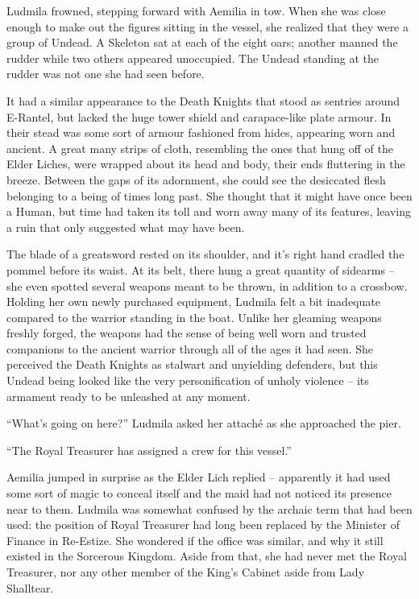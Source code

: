  

Ludmila frowned, stepping forward with Aemilia in tow. When she was close enough to make out the figures sitting in the vessel, she realized that they were a group of Undead. A Skeleton sat at each of the eight oars; another manned the rudder while two others appeared unoccupied. The Undead standing at the rudder was not one she had seen before.

 

It had a similar appearance to the Death Knights that stood as sentries around E-Rantel, but lacked the huge tower shield and carapace-like plate armour. In their stead was some sort of armour fashioned from hides, appearing worn and ancient. A great many strips of cloth, resembling the ones that hung off of the Elder Liches, were wrapped about its head and body, their ends fluttering in the breeze. Between the gaps of its adornment, she could see the desiccated flesh belonging to a being of times long past. She thought that it might have once been a Human, but time had taken its toll and worn away many of its features, leaving a ruin that only suggested what may have been.

 

The blade of a greatsword rested on its shoulder, and it’s right hand cradled the pommel before its waist. At its belt, there hung a great quantity of sidearms – she even spotted several weapons meant to be thrown, in addition to a crossbow. Holding her own newly purchased equipment, Ludmila felt a bit inadequate compared to the warrior standing in the boat. Unlike her gleaming weapons freshly forged, the weapons had the sense of being well worn and trusted companions to the ancient warrior through all of the ages it had seen. She perceived the Death Knights as stalwart and unyielding defenders, but this Undead being looked like the very personification of unholy violence – its armament ready to be unleashed at any moment.

 

“What’s going on here?” Ludmila asked her attaché as she approached the pier.

 

“The Royal Treasurer has assigned a crew for this vessel.”

 

Aemilia jumped in surprise as the Elder Lich replied – apparently it had used some sort of magic to conceal itself and the maid had not noticed its presence near to them. Ludmila was somewhat confused by the archaic term that had been used: the position of Royal Treasurer had long been replaced by the Minister of Finance in Re-Estize. She wondered if the office was similar, and why it still existed in the Sorcerous Kingdom. Aside from that, she had never met the Royal Treasurer, nor any other member of the King’s Cabinet aside from Lady Shalltear.

